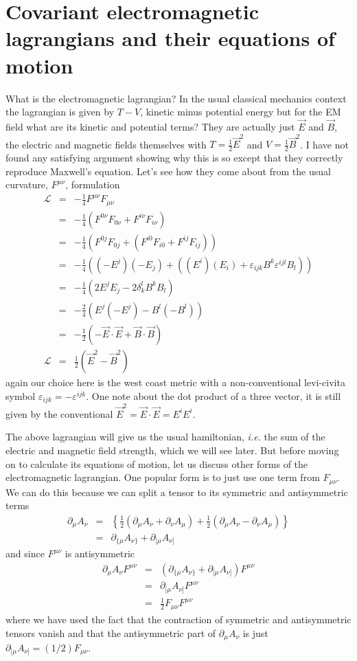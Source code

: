 \documentclass[aps,preprint,preprintnumbers,nofootinbib,showpacs,prd]{revtex4-1}
\newcommand{\ie}{{\it i.e.} }
\newcommand{\nbea}{\begin{eqnarray*}}
\newcommand{\neea}{\end{eqnarray*}}
\begin{document}
\section{Covariant electromagnetic lagrangians and their equations of motion}

What is the electromagnetic lagrangian? In the usual classical mechanics context the lagrangian is given by $T - V$, kinetic minus potential energy but for the EM field what are its kinetic and potential terms? They are actually just $\vec E$ and $\vec B$, the electric and magnetic fields themselves with $T = \frac{1}{2}\vec E^2$ and $V = \frac{1}{2}\vec B^2$.  I have not found any satisfying argument showing why this is so except that they correctly reproduce Maxwell's equation. Let's see how they come about from the usual curvature, $F^{\mu\nu}$, formulation
%
\nbea
\mathcal{L} & = & -\frac{1}{4} F^{\mu\nu}F_{\mu\nu}\\
& = & -\frac{1}{4}  \left ( F^{0\nu}F_{0\nu} + F^{i\nu}F_{i\nu} \right ) \\
& = & -\frac{1}{4}  \left ( F^{0j}F_{0j} + \left ( F^{i0}F_{i0} + F^{ij}F_{ij} \right ) \right ) \\
& = & -\frac{1}{4}  \left ( (-E^j)(-E_j) + \left ( (E^i)(E_i) + \varepsilon_{ijk} B^k  \varepsilon^{ijl} B_l \right ) \right ) \\
& = & -\frac{1}{4}  \left ( 2 E^j E_j - 2 \delta^l_k B^k B_l \right ) \\
& = & -\frac{2}{4}  \left ( E^j (-E^j) - B^l (-B^l) \right ) \\
& = & -\frac{1}{2}  \left ( - \vec E \cdot \vec E + \vec B \cdot \vec B \right ) \\
\mathcal{L} & = & \frac{1}{2}  \left ( \vec E^2 - \vec B^2 \right )
\neea
%
again our choice here is the west coast metric with a non-conventional levi-civita symbol $\varepsilon_{ijk} = -\varepsilon^{ijk}$. One note about the dot product of a three vector, it is still given by the conventional $\vec E^2 = \vec E \cdot \vec E = E^i E^i$.

The above lagrangian will give us the usual hamiltonian, \ie the sum of the electric and magnetic field strength, which we will see later. But before moving on to calculate its equations of motion, let us discuss other forms of the electromagnetic lagrangian. One popular form is to just use one term from $F_{\mu\nu}$. We can do this because we can split a tensor to its symmetric and antisymmetric terms
%
\nbea
\partial_\mu A_\nu & = & \left \{ \frac{1}{2} (\partial_\mu A_\nu + \partial_\nu A_\mu) + \frac{1}{2} (\partial_\mu A_\nu - \partial_\nu A_\mu)\right \} \\
& = & \partial_{\{\mu} A_{\nu\}} + \partial_{[\mu} A_{\nu]}
\neea
%
and since $F^{\mu\nu}$ is antisymmetric
%
\nbea
\partial_\mu A_\nu F^{\mu\nu} & = & (\partial_{\{\mu} A_{\nu\}} + \partial_{[\mu} A_{\nu]}) F^{\mu\nu} \\
& = &  \partial_{[\mu} A_{\nu]} F^{\mu\nu} \\
& = & \frac{1}{2} F_{\mu\nu} F^{\mu\nu}
\neea
%
where we have used the fact that the contraction of symmetric and antisymmetric tensors vanish and that the antisymmetric part of $\partial_\mu A_\nu$ is just $\partial_{[\mu} A_{\nu]} = (1/2) F_{\mu\nu}$.
\end{document}
